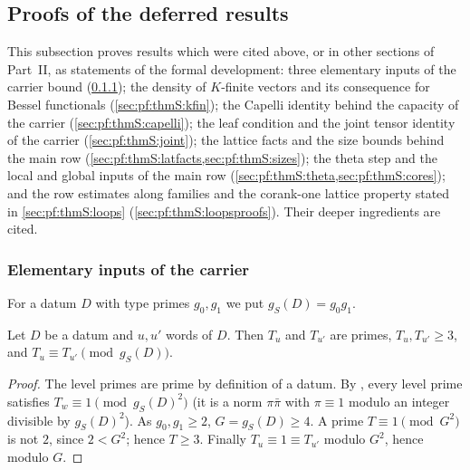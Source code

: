 \subsection{Proofs of the deferred results}\label{sec:pf:thmS:deferred}

This subsection proves results which were cited above, or in other sections of Part~II, as statements of the formal
development: three elementary inputs of the carrier bound (\cref{sec:pf:thmS:elem}); the density of $K$-finite vectors and
its consequence for Bessel functionals (\cref{sec:pf:thmS:kfin}); the Capelli identity behind the capacity of the carrier
(\cref{sec:pf:thmS:capelli}); the leaf condition and the joint tensor identity of the carrier (\cref{sec:pf:thmS:joint}); the
lattice facts and the size bounds behind the main row (\cref{sec:pf:thmS:latfacts,sec:pf:thmS:sizes}); the theta step and
the local and global inputs of the main row (\cref{sec:pf:thmS:theta,sec:pf:thmS:cores}); and the row estimates along
families and the corank-one lattice property stated in \cref{sec:pf:thmS:loops} (\cref{sec:pf:thmS:loopsproofs}). Their
deeper ingredients are cited.

\subsubsection{Elementary inputs of the carrier}\label{sec:pf:thmS:elem}

For a datum $D$ with type primes $g_0,g_1$ we put $g_S(D)=g_0g_1$.

\begin{lemma}\label{pf:thmS:hyptt}
Let $D$ be a datum and $u,u'$ words of $D$. Then $T_u$ and $T_{u'}$ are primes, $T_u,T_{u'}\ge3$, and
$T_u\equiv T_{u'}\pmod{g_S(D)}$.
\end{lemma}

\begin{proof}
The level primes are prime by definition of a datum. By , every level prime
satisfies $T_w\equiv1\pmod{g_S(D)^2}$ (it is a norm $\pi\bar\pi$ with $\pi\equiv1$ modulo an integer divisible by
$g_S(D)^2$). As $g_0,g_1\ge2$, $G=g_S(D)\ge4$. A prime $T\equiv1\pmod{G^2}$ is not $2$, since $2<G^2$; hence $T\ge3$.
Finally $T_u\equiv1\equiv T_{u'}$ modulo $G^2$, hence modulo $G$.
\end{proof}

